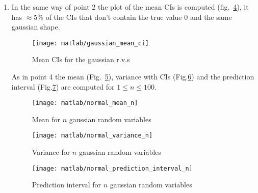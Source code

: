 \documentclass{article}
\begin{document}
\begin{enumerate}
  Fig.~\ref{uniform_mean}. The variances with their confidence
  intervals at level $\gamma = 95\%$ computed with the bootstrap
  method are plotted in Fig.~\ref{uniform_var}. It can be seen that
  the mean goes toward the true value $0.5$ as $1/n$ while the
  variance goes toward $1/12$ as $1/\sqrt{n}$ (and also the CI
  decreases with the same speed).
  \begin{figure}[htbp]
    \centering
    \texttt{[image: matlab/uniform\_mean\_n]}
    \caption{Mean for $n$ uniform random variables}
    \label{uniform_mean}
  \end{figure}
  \begin{figure}[htbp]
    \centering
    \texttt{[image: matlab/uniform\_variance\_n]}
    \caption{Variance for $n$ uniform random variables}
    \label{uniform_var}
  \end{figure}
  The prediction interval (Fig.~\ref{pred_int_unif}) does not depend
  on $n$, so as soon as there are enough samples ($n=39$) it remains
  around the same value. The theoretical values for a 95\% prediction
  interval are $[0.025, 0.975]$.
  \begin{figure}[htbp]
    \centering
    \texttt{[image: matlab/uniform\_prediction\_interval\_n]}
    \caption{Prediction interval for $n$ uniform random variables}
    \label{pred_int_unif}
  \end{figure}
\item In the same way of point 2 the plot of the mean CIs is computed
  (fig.~\ref{gaussian_mean_ci}), it has $\approx 5\%$ of the CIs that
  don't contain the true value 0 and the same gaussian shape.
  \begin{figure}[htbp]
    \centering
    \texttt{[image: matlab/gaussian\_mean\_ci]}
    \caption{Mean CIs for the gaussian r.v.s}
    \label{gaussian_mean_ci}
  \end{figure}

  As in point 4 the mean (Fig.~\ref{gaussian_mean_n}), variance with
  CIs (Fig.\ref{gaussian_var_n}) and the prediction interval
  (Fig.\ref{gaussian_pred_int_n}) are computed for $1 \leq n \leq 100$.
  \begin{figure}[htbp]
    \centering
    \texttt{[image: matlab/normal\_mean\_n]}
    \caption{Mean for $n$ gaussian random variables}
    \label{gaussian_mean_n}
  \end{figure}
  \begin{figure}[htbp]
    \centering
    \texttt{[image: matlab/normal\_variance\_n]}
    \caption{Variance for $n$ gaussian random variables}
    \label{gaussian_var_n}
  \end{figure}
    \begin{figure}[htbp]
    \centering
    \texttt{[image: matlab/normal\_prediction\_interval\_n]}
    \caption{Prediction interval for $n$ gaussian random variables}
    \label{gaussian_pred_int_n}
  \end{figure}

\end{enumerate}
\end{document}
